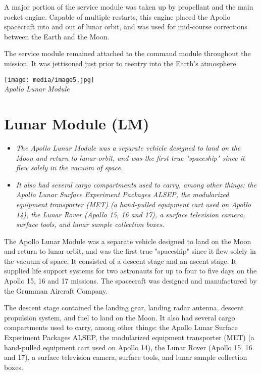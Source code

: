 A major portion of the service module was taken up by propellant and the
main rocket engine. Capable of multiple restarts, this engine placed the
Apollo spacecraft into and out of lunar orbit, and was used for
mid-course corrections between the Earth and the Moon.

The service module remained attached to the command module throughout
the mission. It was jettisoned just prior to reentry into the Earth's
atmosphere.

\texttt{[image: media/image5.jpg]}\\
\emph{Apollo Lunar Module}

\section{Lunar Module (LM)}\label{lunar-module-lm}

\begin{itemize}
\item
  \emph{The Apollo Lunar Module was a separate vehicle designed to land
  on the Moon and return to lunar orbit, and was the first true
  "spaceship" since it flew solely in the vacuum of space.}
\item
  \emph{It also had several cargo compartments used to carry, among
  other things: the Apollo Lunar Surface Experiment Packages ALSEP, the
  modularized equipment transporter (MET) (a hand-pulled equipment cart
  used on Apollo 14), the Lunar Rover (Apollo 15, 16 and 17), a surface
  television camera, surface tools, and lunar sample collection boxes.}
\end{itemize}

The Apollo Lunar Module was a separate vehicle designed to land on the
Moon and return to lunar orbit, and was the first true "spaceship" since
it flew solely in the vacuum of space. It consisted of a descent stage
and an ascent stage. It supplied life support systems for two astronauts
for up to four to five days on the Apollo 15, 16 and 17 missions. The
spacecraft was designed and manufactured by the Grumman Aircraft
Company.

The descent stage contained the landing gear, landing radar antenna,
descent propulsion system, and fuel to land on the Moon. It also had
several cargo compartments used to carry, among other things: the Apollo
Lunar Surface Experiment Packages ALSEP, the modularized equipment
transporter (MET) (a hand-pulled equipment cart used on Apollo 14), the
Lunar Rover (Apollo 15, 16 and 17), a surface television camera, surface
tools, and lunar sample collection boxes.

